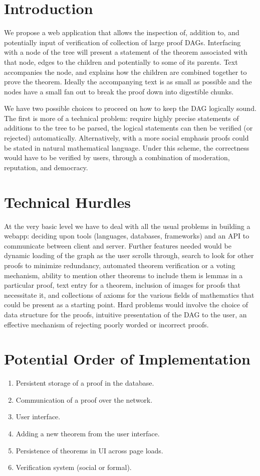 \documentclass{acm_proc_article-sp}
\begin{document}
\section{Introduction}
We propose a web application that allows the inspection of, addition to, and
potentially input of verification of collection of large proof DAGs.
Interfacing with a node of the tree will present a statement of the theorem
associated with that node, edges to the children and potentially to some of its
parents. Text accompanies the node, and explains how the children are combined
together to prove the theorem. Ideally the accompanying text is as small as
possible and the nodes have a small fan out to break the proof down into
digestible chunks.

We have two possible choices to proceed on how to keep the DAG logically sound.
The first is more of a technical problem: require highly precise statements of
additions to the tree to be parsed, the logical statements can then be verified
(or rejected) automatically. Alternatively, with a more social emphasis proofs
could be stated in natural mathematical language. Under this scheme, the
correctness would have to be verified by users, through a combination
of moderation, reputation, and democracy.

\section{Technical Hurdles}
At the very basic level we have to deal with all the usual problems in
building a webapp: deciding upon tools (languages, databases, frameworks)
and an API to communicate between client and server. Further features
needed would be dynamic loading of the graph as the user scrolls through,
search to look for other proofs to minimize redundancy, automated theorem
verification or a voting mechanism, ability to mention other theorems
to include them is lemmas in a particular proof, text entry for a theorem,
inclusion of images for proofs that necessitate it, and collections of
axioms for the various fields of mathematics that could be present as
a starting point. Hard problems would involve the choice of data 
structure for the proofs, intuitive presentation of the DAG to the user,
an effective mechanism of rejecting poorly worded or incorrect proofs.

\section{Potential Order of Implementation}
\begin{enumerate}
    \item Persistent storage of a proof in the database.
    \item Communication of a proof over the network.
    \item User interface.
    \item Adding a new theorem from the user interface.
    \item Persistence of theorems in UI across page loads.
    \item Verification system (social or formal). 
\end{enumerate}
\end{document}
